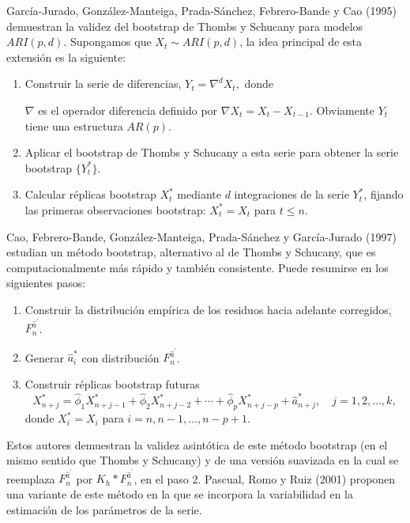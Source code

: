 \documentclass[]{book}
\theoremstyle{definition}
\theoremstyle{definition}
\theoremstyle{definition}
\theoremstyle{remark}
\begin{document}
García-Jurado, González-Manteiga, Prada-Sánchez, Febrero-Bande y Cao
(1995) demuestran la validez del bootstrap de Thombs y Schucany para
modelos \(ARI(p,d)\). Supongamos que \(X_{t}\sim ARI(p,d)\), la idea
principal de esta extensión es la siguiente:

\begin{enumerate}
\def\labelenumi{\arabic{enumi}.}
\item
  Construir la serie de diferencias, \(Y_{t}=\nabla^{d}X_{t},\) donde

  \(\nabla\) es el operador diferencia definido por
  \(\nabla X_{t}=X_{t}-X_{t-1}\). Obviamente \(Y_{t}\) tiene una
  estructura \(AR(p)\).
\item
  Aplicar el bootstrap de Thombs y Schucany a esta serie para obtener la
  serie bootstrap \(\{Y_{t}^{\ast}\}\).
\item
  Calcular réplicas bootstrap \(X_{t}^{\ast}\) mediante \(d\)
  integraciones de la serie \(Y_{t}^{\ast}\), fijando las primeras
  observaciones bootstrap: \(X_{t}^{\ast}=X_{t}\) para \(t\leq n\).
\end{enumerate}

Cao, Febrero-Bande, González-Manteiga, Prada-Sánchez y García-Jurado
(1997) estudian un método bootstrap, alternativo al de Thombs y
Schucany, que es computacionalmente más rápido y también consistente.
Puede resumirse en los siguientes pasos:

\begin{enumerate}
\def\labelenumi{\arabic{enumi}.}
\item
  Construir la distribución empírica de los residuos hacia adelante
  corregidos, \(F_n^{\widehat{a}^{\prime}}\).
\item
  Generar \(\widehat{a}_i^{\ast}\) con distribución
  \(F_n^{ \widehat{a}^{\prime}}\).
\item
  Construir réplicas bootstrap futuras
  \[X_{n+j}^{\ast}=\widehat{\phi}_1X_{n+j-1}^{\ast}
  +\widehat{\phi}_2X_{n+j-2}^{\ast} + \cdots +\widehat{\phi}_{p}X_{n+j-p}^{\ast}
  +\widehat{a}_{n+j}^{\ast},\quad j=1,2,\ldots ,k,\] donde
  \(X_i^{\ast}=X_i\) para \(i=n,n-1,\ldots ,n-p+1.\)
\end{enumerate}

Estos autores demuestran la validez asintótica de este método bootstrap
(en el mismo sentido que Thombs y Schucany) y de una versión suavizada
en la cual se reemplaza \(F_n^{\widehat{a}^{\prime}}\) por
\(K_{h}\ast F_n^{\widehat{a}^{\prime}}\), en el paso 2. Pascual, Romo y
Ruiz (2001) proponen una variante de este método en la que se incorpora
la variabilidad en la estimación de los parámetros de la serie.
\end{document}
